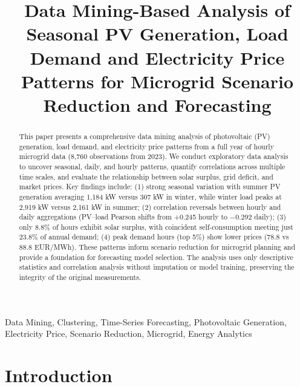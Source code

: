 \documentclass[conference]{IEEEtran}
\begin{document}
\title{Data Mining-Based Analysis of Seasonal PV Generation, Load Demand and Electricity Price Patterns for Microgrid Scenario Reduction and Forecasting}

\author{
}

\maketitle

\begin{abstract}
This paper presents a comprehensive data mining analysis of photovoltaic (PV) generation, load demand, and electricity price patterns from a full year of hourly microgrid data (8,760 observations from 2023). We conduct exploratory data analysis to uncover seasonal, daily, and hourly patterns, quantify correlations across multiple time scales, and evaluate the relationship between solar surplus, grid deficit, and market prices. Key findings include: (1) strong seasonal variation with summer PV generation averaging 1,184 kW versus 307 kW in winter, while winter load peaks at 2,919 kW versus 2,161 kW in summer; (2) correlation reversals between hourly and daily aggregations (PV–load Pearson shifts from +0.245 hourly to −0.292 daily); (3) only 8.8\% of hours exhibit solar surplus, with coincident self-consumption meeting just 23.8\% of annual demand; (4) peak demand hours (top 5\%) show lower prices (78.8 vs 88.8 EUR/MWh). These patterns inform scenario reduction for microgrid planning and provide a foundation for forecasting model selection. The analysis uses only descriptive statistics and correlation analysis without imputation or model training, preserving the integrity of the original measurements.
\end{abstract}

\begin{IEEEkeywords}
Data Mining, Clustering, Time-Series Forecasting, Photovoltaic Generation, Electricity Price, Scenario Reduction, Microgrid, Energy Analytics
\end{IEEEkeywords}

\section{Introduction}
\label{sec:introduction}
\end{document}

